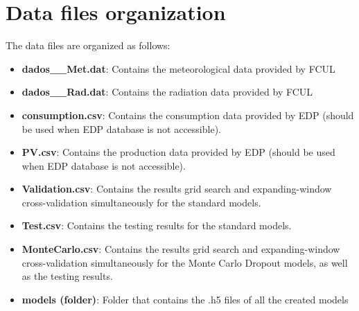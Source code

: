 \section{Data files organization}
The data files are organized as follows:
\begin{itemize}
    \item \textbf{dados\_\_Met.dat}: Contains the meteorological data provided by \ac{FCUL}
    \item \textbf{dados\_\_Rad.dat}: Contains the radiation data provided by \ac{FCUL}
    \item \textbf{consumption.csv}: Contains the consumption data provided by \ac{EDP} (should be used when \ac{EDP} database is not accessible). 
    \item \textbf{PV.csv}: Contains the production data provided by \ac{EDP} (should be used when \ac{EDP} database is not accessible). 
    \item \textbf{Validation.csv}: Contains the results grid search and expanding-window cross-validation simultaneously for the standard models.
    \item \textbf{Test.csv}: Contains the testing results for the standard models.
    \item \textbf{MonteCarlo.csv}: Contains the results grid search and expanding-window cross-validation simultaneously for the Monte Carlo Dropout models, as well as the testing results.
    \item \textbf{models (folder)}: Folder that contains the .h5 files of all the created models
\end{itemize}
